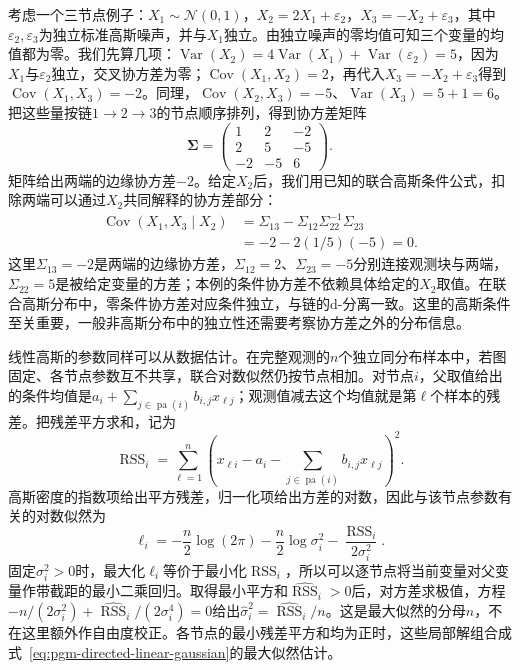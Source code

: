 考虑一个三节点例子：$X_1\sim\mathcal N(0,1)$，$X_2=2X_1+\varepsilon_2$，$X_3=-X_2+\varepsilon_3$，其中$\varepsilon_2,\varepsilon_3$为独立标准高斯噪声，并与$X_1$独立。由独立噪声的零均值可知三个变量的均值都为零。我们先算几项：$\operatorname{Var}(X_2)=4\operatorname{Var}(X_1)+\operatorname{Var}(\varepsilon_2)=5$，因为$X_1$与$\varepsilon_2$独立，交叉协方差为零；$\operatorname{Cov}(X_1,X_2)=2$，再代入$X_3=-X_2+\varepsilon_3$得到$\operatorname{Cov}(X_1,X_3)=-2$。同理，$\operatorname{Cov}(X_2,X_3)=-5$、$\operatorname{Var}(X_3)=5+1=6$。把这些量按链$1\to2\to3$的节点顺序排列，得到协方差矩阵
\[
  \bm\Sigma=
  \begin{pmatrix}
    1&2&-2\\
    2&5&-5\\
    -2&-5&6
  \end{pmatrix}.
\]
矩阵给出两端的边缘协方差$-2$。给定$X_2$后，我们用已知的联合高斯条件公式，扣除两端可以通过$X_2$共同解释的协方差部分：
\[
  \begin{aligned}
    \operatorname{Cov}(X_1,X_3\mid X_2)
      &=\Sigma_{13}-\Sigma_{12}\Sigma_{22}^{-1}\Sigma_{23}\\
      &=-2-2(1/5)(-5)=0.
  \end{aligned}
\]
这里$\Sigma_{13}=-2$是两端的边缘协方差，$\Sigma_{12}=2$、$\Sigma_{23}=-5$分别连接观测块与两端，$\Sigma_{22}=5$是被给定变量的方差；本例的条件协方差不依赖具体给定的$X_2$取值。在联合高斯分布中，零条件协方差对应条件独立，与链的d-分离一致。这里的高斯条件至关重要，一般非高斯分布中的独立性还需要考察协方差之外的分布信息。

线性高斯的参数同样可以从数据估计。在完整观测的$n$个独立同分布样本中，若图固定、各节点参数互不共享，联合对数似然仍按节点相加。对节点$i$，父取值给出的条件均值是$a_i+\sum_{j\in\operatorname{pa}(i)}b_{i,j}x_{\ell j}$；观测值减去这个均值就是第$\ell$个样本的残差。把残差平方求和，记为
\[
  \operatorname{RSS}_i
    =\sum_{\ell=1}^{n}\left(
      x_{\ell i}-a_i-\sum_{j\in\operatorname{pa}(i)}b_{i,j}x_{\ell j}
      \right)^2.
\]
高斯密度的指数项给出平方残差，归一化项给出方差的对数，因此与该节点参数有关的对数似然为
\[
  \ell_i
    =-\frac n2\log(2\pi)-\frac n2\log\sigma_i^2
      -\frac{\operatorname{RSS}_i}{2\sigma_i^2}.
\]
固定$\sigma_i^2>0$时，最大化$\ell_i$等价于最小化$\operatorname{RSS}_i$，所以可以逐节点将当前变量对父变量作带截距的最小二乘回归。取得最小平方和$\widehat{\operatorname{RSS}}_i>0$后，对方差求极值，方程$-n/(2\sigma_i^2)+\widehat{\operatorname{RSS}}_i/(2\sigma_i^4)=0$给出$\widehat\sigma_i^2=\widehat{\operatorname{RSS}}_i/n$。这是最大似然的分母$n$，不在这里额外作自由度校正。各节点的最小残差平方和均为正时，这些局部解组合成式~\eqref{eq:pgm-directed-linear-gaussian}的最大似然估计。

